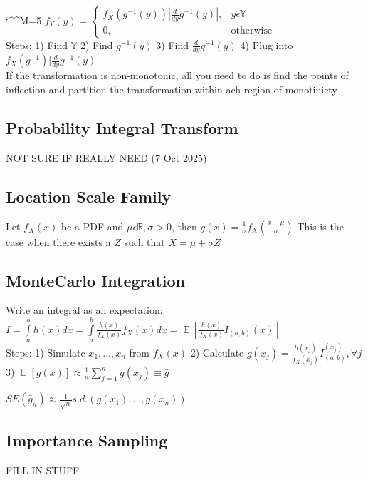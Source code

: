 \documentclass[twocolumn]{article}
\def\disobeylines{\catcode`\^^M=5 } %
\DeclareMathOperator{\EX}{\mathbb{E}} %
\let\Oldint=\int
\let\Oldsum=\sum
\renewcommand{\int}{\Oldint\limits}
\renewcommand{\sum}{\Oldsum\limits}
\begin{document}
\disobeylines
\begin{math}
  f_Y(y) = \left\{
    \begin{array}{ll}
      f_X(g^{-1}(y)) |\frac{d}{dy} g^{-1}(y)|, & y \epsilon \mathbb{Y}\\
      0,                                    & \text{otherwise}
    \end{array}
  \right.
\end{math}
\obeylines\\

Steps:
1) Find $\mathbb{Y}$
2) Find $g^{-1}(y)$
3) Find $\frac{d}{dy} g^{-1}(y)$
4) Plug into $f_X(g^{-1})|\frac{d}{dy}g^{-1}(y)$\\

If the transformation is non-monotonic, all you need to do is find the points of inflection and partition the transformation within ach region of monotinicty

\subsection*{Probability Integral Transform}
NOT SURE IF REALLY NEED (7 Oct 2025)


\subsection*{Location Scale Family}
Let $f_X(x)$ be a PDF and $\mu \epsilon \mathbb{R}, \sigma > 0$, then
$g(x) = \frac{1}{\sigma} f_X(\frac{x - \mu}{\sigma})$
This is the case when there exists a $Z$ such that $X = \mu + \sigma Z$

\subsection*{MonteCarlo Integration}
Write an integral as an expectation:
$I = \int_a^b h(x) dx = \int_a^b \frac{h(x)}{f_X(x)} f_X(x) dx = \EX[\frac{h(x)}{f_X(x)} I_{(a, b)}(x)]$\\

Steps: 
1) Simulate $x_1, ..., x_n$ from $f_X(x)$
2) Calculate $g(x_j) = \frac{h(x_j)}{f_X(x_j)} I_{(a, b)}^{(x_j)}, \forall j$
3) $\EX[g(x)] \approx \frac{1}{n} \sum_{j=1}^{n} g(x_j) \equiv \bar{g}$

$SE(\bar{g}_n) \approx \frac{1}{\sqrt{n}} s.d.(g(x_1), ..., g(x_n))$

\subsection*{Importance Sampling}
FILL IN STUFF
\end{document}
